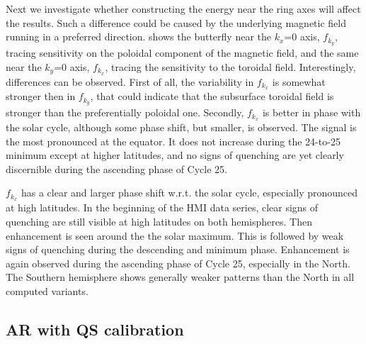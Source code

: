 \documentclass{aa}
\begin{document}
Next we investigate whether constructing the \fff 
energy
near
the ring axes will affect the results. Such a difference could be caused by the underlying magnetic field running in a preferred direction. 
 shows the butterfly near the $k_x$=0 axis, $f_{k_{y}}$, tracing \fff sensitivity on the poloidal component of the
magnetic field, and  the same near the $k_y$=0 axis,
$f_{k_{x}}$, tracing the sensitivity to the toroidal field. Interestingly,
differences can be observed. First of all, the variability in
$f_{k_{x}}$ is somewhat stronger then in $f_{k_{y}}$, that
could indicate that the subsurface toroidal field is stronger
than the preferentially poloidal one. Secondly, $f_{k_{x}}$ is
better in phase with the solar cycle, although some phase shift,
but smaller, is observed. The signal is the most pronounced
at the equator. It does not increase during the 24-to-25
minimum except at higher latitudes, and no signs of quenching
are yet clearly discernible during the ascending phase of Cycle 25. 

$f_{k_{x}}$ has a clear and larger phase shift w.r.t. the solar 
cycle, especially pronounced at high latitudes. In the beginning
of the HMI data series, clear signs of quenching are still
visible at high latitudes on both hemispheres. Then enhancement is 
seen around the the solar maximum. This is followed by weak signs
of quenching during the descending and minimum phase. Enhancement
is again observed during the ascending phase of Cycle 25, especially
in the North. The Southern hemisphere shows generally weaker
patterns than the North in all 
computed
\fff 
variants.


\subsection{AR \fff with QS calibration}\label{arf}
\end{document}
